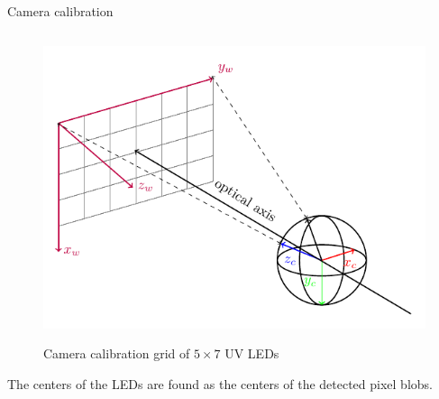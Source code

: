 \documentclass{beamer}
\begin{document}
\begin{frame}{Camera calibration}
\begin{columns}[T]
    \begin{column}{0.48\textwidth}
        \vspace{-0.3cm}
        \begin{figure}[H]
            \centering
            \includegraphics[width=\textwidth]{../fig/tikz/extrinsic.pdf}
            \label{fig:extrinsic_img}
            \caption{Camera calibration grid of $5\times7$ UV LEDs}
        \end{figure}
        
        \tiny{
            The centers of the LEDs are found as the centers of the detected pixel blobs.
        }
    \end{column}
\end{columns}
    
\end{frame}
\end{document}

